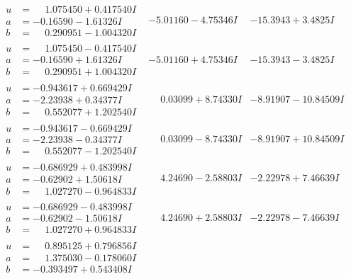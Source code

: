 \documentclass[1p]{elsarticle_modified}
\theoremstyle{definition}
\begin{document}
$$\begin{array}{c|c|c}
\begin{aligned}
u &= \phantom{-}1.075450 + 0.417540 I \\
a &= -0.16590 - 1.61326 I \\
b &= \phantom{-}0.290951 - 1.004320 I\end{aligned}
 & -5.01160 - 4.75346 I & -15.3943 + 3.4825 I \\ \hline\begin{aligned}
u &= \phantom{-}1.075450 - 0.417540 I \\
a &= -0.16590 + 1.61326 I \\
b &= \phantom{-}0.290951 + 1.004320 I\end{aligned}
 & -5.01160 + 4.75346 I & -15.3943 - 3.4825 I \\ \hline\begin{aligned}
u &= -0.943617 + 0.669429 I \\
a &= -2.23938 + 0.34377 I \\
b &= \phantom{-}0.552077 + 1.202540 I\end{aligned}
 & \phantom{-}0.03099 + 8.74330 I & -8.91907 - 10.84509 I \\ \hline\begin{aligned}
u &= -0.943617 - 0.669429 I \\
a &= -2.23938 - 0.34377 I \\
b &= \phantom{-}0.552077 - 1.202540 I\end{aligned}
 & \phantom{-}0.03099 - 8.74330 I & -8.91907 + 10.84509 I \\ \hline\begin{aligned}
u &= -0.686929 + 0.483998 I \\
a &= -0.62902 + 1.50618 I \\
b &= \phantom{-}1.027270 - 0.964833 I\end{aligned}
 & \phantom{-}4.24690 - 2.58803 I & -2.22978 + 7.46639 I \\ \hline\begin{aligned}
u &= -0.686929 - 0.483998 I \\
a &= -0.62902 - 1.50618 I \\
b &= \phantom{-}1.027270 + 0.964833 I\end{aligned}
 & \phantom{-}4.24690 + 2.58803 I & -2.22978 - 7.46639 I \\ \hline\begin{aligned}
u &= \phantom{-}0.895125 + 0.796856 I \\
a &= \phantom{-}1.375030 - 0.178060 I \\
b &= -0.393497 + 0.543408 I\end{aligned}

\end{array}$$
\end{document}
